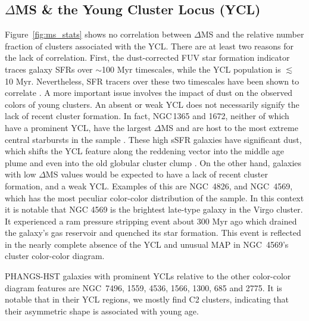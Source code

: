 \documentclass[linenumbers]{aastex63}
\begin{document}
{



\subsection{$\Delta$MS \& the Young Cluster Locus (YCL)}\label{sec:ycl}
Figure~\ref{fig:ms_stats} shows no correlation between $\Delta$MS and the relative number fraction of clusters associated with the YCL. There are at least two reasons for the lack of correlation.  First, the dust-corrected FUV star formation indicator traces galaxy SFRs over $\sim$100 Myr timescales, while the YCL population is $\lesssim$ 10 Myr.  Nevertheless, SFR tracers over these two timescales have been shown to correlate \citep[e.g.,][and references therein]{salim_uv_2007, lee_comparison_2009}.  A more important issue involves the impact of dust on the observed colors of young clusters.   An absent or weak YCL does not necessarily signify the lack of recent cluster formation.  In fact, NGC\,1365 and 1672, neither of which have a prominent YCL, have the largest $\Delta$MS and are host to the most extreme central starbursts in the sample \citep{brandt_rosat_1996, querejeta_stellar_2021, whitmore_phangs-jwst_2023}.  These high sSFR galaxies have significant dust, which shifts the YCL feature along the reddening vector into the middle age plume \citep{thilker23sed} and even into the old globular cluster clump \citep{hollyhead_studying_2015}. On the other hand, galaxies with low $\Delta$MS values would be expected to have a lack of recent cluster formation, and a weak YCL.  Examples of this are NGC~4826, and NGC~4569, which has the most peculiar color-color distribution of the sample.  In this context it is notable that NGC 4569 is the brightest late-type galaxy in the Virgo cluster.  It experienced a ram pressure stripping event about 300 Myr ago \citep{vollmer_ngc_2004,crowl_stellar_2008,boselli_spectacular_2016} which drained the galaxy's gas reservoir and quenched its star formation.  This event is reflected in the nearly complete absence of the YCL and unusual MAP in NGC~4569's cluster color-color diagram.

PHANGS-HST galaxies with prominent YCLs relative to the other color-color diagram features are
NGC~7496, 1559, 4536, 1566, 1300, 685 and 2775. %
It is notable that in their YCL regions, we mostly find C2 clusters, indicating that their asymmetric shape is associated with young age.   %

}
\end{document}
